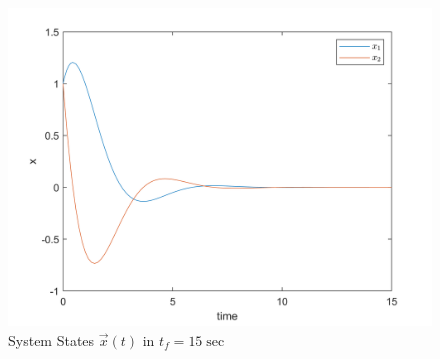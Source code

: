 \begin{itemize}
\begin{figure}[H]
\end{figure}
\begin{figure}[H]
	\caption{System States $\vec x(t)$ in $t_f = 15\sec$}
	\centering
	\includegraphics[width=12cm]{../Code/Q3/figures/tf15.png}
\end{figure}
\end{itemize}